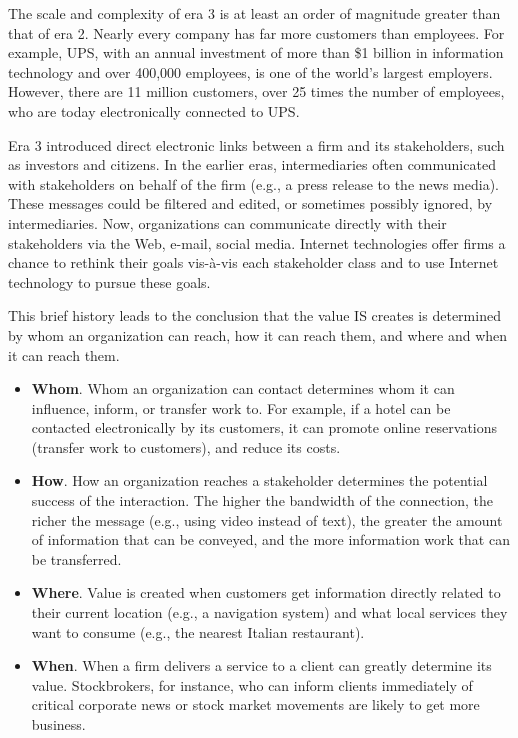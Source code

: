 \documentclass[
]{article}
\begin{document}
The scale and complexity of era 3 is at least an order of magnitude
greater than that of era 2. Nearly every company has far more customers
than employees. For example, UPS, with an annual investment of more than
\$1 billion in information technology and over 400,000 employees, is one
of the world's largest employers. However, there are 11 million
customers, over 25 times the number of employees, who are today
electronically connected to UPS.

Era 3 introduced direct electronic links between a firm and its
stakeholders, such as investors and citizens. In the earlier eras,
intermediaries often communicated with stakeholders on behalf of the
firm (e.g., a press release to the news media). These messages could be
filtered and edited, or sometimes possibly ignored, by intermediaries.
Now, organizations can communicate directly with their stakeholders via
the Web, e-mail, social media. Internet technologies offer firms a
chance to rethink their goals vis-à-vis each stakeholder class and to
use Internet technology to pursue these goals.

This brief history leads to the conclusion that the value IS creates is
determined by whom an organization can reach, how it can reach them, and
where and when it can reach them.

\begin{itemize}
\item
  \textbf{Whom}. Whom an organization can contact determines whom it can
  influence, inform, or transfer work to. For example, if a hotel can
  be contacted electronically by its customers, it can promote online
  reservations (transfer work to customers), and reduce its costs.
\item
  \textbf{How}. How an organization reaches a stakeholder determines the
  potential success of the interaction. The higher the bandwidth of
  the connection, the richer the message (e.g., using video instead of
  text), the greater the amount of information that can be conveyed,
  and the more information work that can be transferred.
\item
  \textbf{Where}. Value is created when customers get information directly
  related to their current location (e.g., a navigation system) and
  what local services they want to consume (e.g., the nearest Italian
  restaurant).
\item
  \textbf{When}. When a firm delivers a service to a client can greatly
  determine its value. Stockbrokers, for instance, who can inform
  clients immediately of critical corporate news or stock market
  movements are likely to get more business.
\end{itemize}
\end{document}
